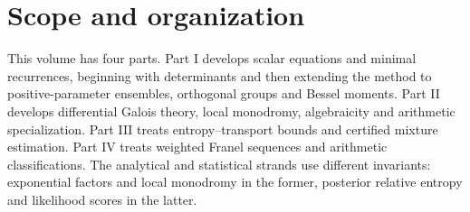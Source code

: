 \documentclass[11pt,a4paper]{article}
\theoremstyle{definition}
\theoremstyle{remark}
\numberwithin{equation}{section}
\begin{document}
\section{Scope and organization}\label{fusion:introduction}
This volume has four parts. Part I develops scalar equations and minimal
recurrences, beginning with determinants and then extending the method
to positive-parameter ensembles, orthogonal groups and Bessel moments.
Part II develops differential Galois theory, local monodromy,
algebraicity and arithmetic specialization. Part III treats
entropy--transport bounds and certified mixture estimation. Part IV
treats weighted Franel sequences and arithmetic classifications.
The analytical and statistical strands use different invariants:
exponential factors and local monodromy in the former, posterior
relative entropy and likelihood scores in the latter.
\end{document}
